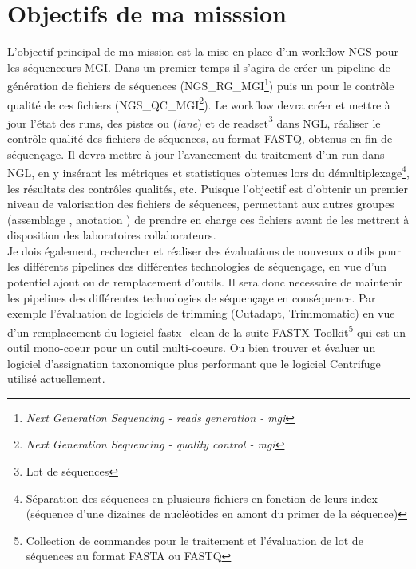 \section{Objectifs de ma misssion}
L'objectif principal de ma mission est la mise en place d'un workflow NGS pour les séquenceurs MGI. Dans un premier temps il s'agira de créer un pipeline de génération de fichiers de séquences (NGS\_RG\_MGI\footnote{\emph{Next Generation Sequencing - reads generation - mgi}}) puis un pour le contrôle qualité de ces fichiers (NGS\_QC\_MGI\footnote{\emph{Next Generation Sequencing - quality control - mgi}}). Le workflow devra créer et mettre à jour l'état des runs, des pistes ou (\emph{lane}) et de readset\footnote{Lot de séquences} dans NGL, réaliser le contrôle qualité des fichiers de séquences, au format FASTQ, obtenus en fin de séquençage. Il devra mettre à jour l'avancement du traitement d'un run dans NGL, en y insérant les métriques et statistiques obtenues lors du démultiplexage\footnote{Séparation des séquences en plusieurs fichiers en fonction de leurs index (séquence d'une dizaines de nucléotides en amont du primer de la séquence)}, les résultats des contrôles qualités, etc. Puisque l'objectif est d'obtenir un premier niveau de valorisation des fichiers de séquences, permettant aux autres groupes (\og assemblage \fg{}, \og anotation \fg{}) de prendre en charge ces fichiers avant de les mettrent à disposition des laboratoires collaborateurs.\\

Je dois également, rechercher et réaliser des évaluations de nouveaux outils pour les différents pipelines des différentes technologies de séquençage, en vue d'un potentiel ajout ou de remplacement d'outils. Il sera donc necessaire de maintenir les pipelines des différentes technologies de séquençage en conséquence. Par exemple l'évaluation de logiciels de trimming (Cutadapt, Trimmomatic) en vue d'un remplacement du logiciel fastx\_clean de la suite FASTX Toolkit\footnote{Collection de commandes pour le traitement et l'évaluation de lot de séquences au format FASTA ou FASTQ} qui est un outil mono-coeur pour un outil multi-coeurs. Ou bien trouver et évaluer un logiciel d'assignation taxonomique plus performant que le logiciel Centrifuge utilisé actuellement.